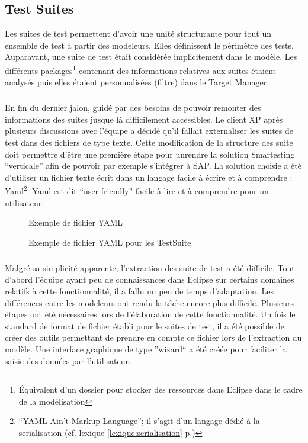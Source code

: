 \subsection{Test Suites}
Les suites de test permettent d'avoir une unité structurante pour tout un ensemble de test à partir des modeleurs. Elles définissent le périmètre des tests. Auparavant, une suite de test était considérée implicitement dans le modèle. Les différents packages\footnote{Équivalent d'un dossier pour stocker des ressources dans Eclipse dans le cadre de la modélisation} contenant des informations relatives aux suites étaient analysés puis elles étaient personnalisées (filtre) dans le Target Manager. 
\subparagraph*{}
En fin du dernier jalon, guidé par des besoins de pouvoir remonter des informations des suites jusque là difficilement accessibles. Le client XP après plusieurs discussions avec l'équipe a décidé qu'il fallait externaliser les suites de test dans des fichiers de type texte. Cette modification de la structure des suite doit permettre d'être une première étape pour unrendre la solution Smartesting ``verticale'' afin de pouvoir par exemple s'intégrer à SAP. La solution choisie a été d'utiliser un fichier texte écrit dans un langage facile à écrire et à comprendre : Yaml\footnote{``YAML Ain't Markup Language''; il s'agit d'un langage dédié à la serialisation (cf. lexique \ref{lexique:serialisation} p.\pageref{lexique:serialisation})}. Yaml est dit ``user friendly'' facile à lire et à comprendre pour un utilisateur.
\begin{figure}[!ht]
\centering
{}
\caption{Exemple de fichier YAML}
\label{figure:exYaml}
\end{figure}
\begin{figure}[!ht]
\centering
{}
\caption{Exemple de fichier YAML pour les TestSuite}
\label{figure:exTestSuite}
\end{figure} 
\subparagraph*{}
Malgré sa simplicité apparente, l'extraction des suite de test a été difficile. Tout d'abord l'équipe ayant peu de connaissances dans Eclipse sur certains domaines relatifs à cette fonctionnalité, il a fallu un peu de temps d'adaptation. Les différences entre les modeleurs ont rendu la tâche encore plus difficile. Plusieurs étapes ont été nécessaires lors de l'élaboration de cette fonctionnalité. Un fois le standard de format de fichier établi pour le suites de test, il a été possible de créer des outils permettant de prendre en compte ce fichier lors de l'extraction du modèle. Une interface graphique de type ''wizard`` a été créée pour faciliter la saisie des données par l'utilisateur.

